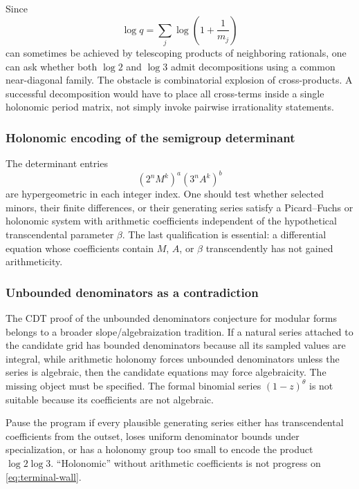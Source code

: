 \documentclass[10pt,letterpaper]{article}
\begin{document}
Since
\[
  \log q=\sum_j \log\left(1+\frac{1}{m_j}\right)
\]
can sometimes be achieved by telescoping products of neighboring rationals, one can ask
whether both \(\log2\) and \(\log3\) admit decompositions using a common near-diagonal family.
The obstacle is combinatorial explosion of cross-products.  A successful decomposition
would have to place all cross-terms inside a single holonomic period matrix, not simply
invoke pairwise irrationality statements.

\subsubsection{Holonomic encoding of the semigroup determinant}

The determinant entries
\[
  (2^nM^k)^a(3^nA^k)^b
\]
are hypergeometric in each integer index.  One should test whether selected minors, their
finite differences, or their generating series satisfy a Picard--Fuchs or holonomic system
with arithmetic coefficients independent of the hypothetical transcendental parameter
\(\beta\).  The last qualification is essential: a differential equation whose coefficients
contain \(M\), \(A\), or \(\beta\) transcendently has not gained arithmeticity.

\subsubsection{Unbounded denominators as a contradiction}

The CDT proof of the unbounded denominators conjecture for modular forms
\cite{CDTUnbounded} belongs to a broader slope/algebraization tradition.  If a natural series
attached to the candidate grid has bounded denominators because all its sampled values are
integral, while arithmetic holonomy forces unbounded denominators unless the series is
algebraic, then the candidate equations may force algebraicity.  The missing object must be
specified.  The formal binomial series \((1-z)^\theta\) is not suitable because its
coefficients are not algebraic.

\begin{stopbox}
Pause the program if every plausible generating series either has transcendental
coefficients from the outset, loses uniform denominator bounds under specialization, or has
a holonomy group too small to encode the product \(\log2\log3\).  ``Holonomic'' without
arithmetic coefficients is not progress on \cref{eq:terminal-wall}.
\end{stopbox}
\end{document}
